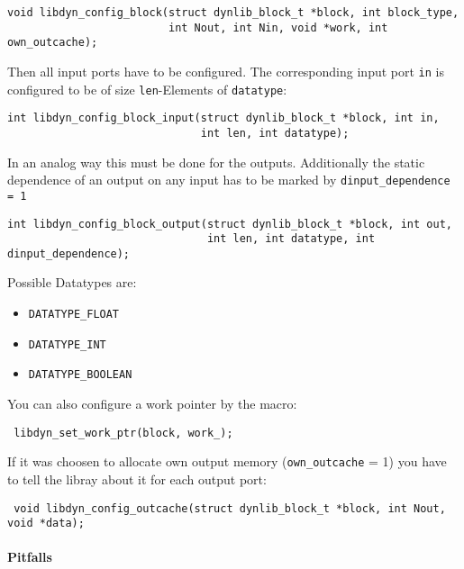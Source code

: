 \documentclass[%
	pdftex,%
	a4paper,%
	oneside,%
	11pt,%
	halfparskip,%
	headsepline,%
	bibtotocnumbered,%
	idxtotoc%
]{scrartcl}
\begin{document}
\begin{verbatim}
void libdyn_config_block(struct dynlib_block_t *block, int block_type, 
                         int Nout, int Nin, void *work, int own_outcache);
\end{verbatim}

Then all input ports have to be configured. The corresponding input port  \texttt{in} is configured to be of size \texttt{len}-Elements of \texttt{datatype}:

\begin{verbatim}
int libdyn_config_block_input(struct dynlib_block_t *block, int in, 
                              int len, int datatype);
\end{verbatim}

In an analog way this must be done for the outputs. Additionally the static dependence of an output on any input has to be marked by \texttt{dinput\_dependence = 1}

\begin{verbatim}
int libdyn_config_block_output(struct dynlib_block_t *block, int out, 
                               int len, int datatype, int dinput_dependence);
\end{verbatim}

Possible Datatypes are:

\begin{itemize}
 \item \texttt{DATATYPE\_FLOAT} 
 \item \texttt{DATATYPE\_INT}
 \item \texttt{DATATYPE\_BOOLEAN}
\end{itemize}

You can also configure a work pointer by the macro:

\begin{verbatim}
 libdyn_set_work_ptr(block, work_);
\end{verbatim}

If it was choosen to allocate own output memory (\texttt{own\_outcache} = 1) you have to tell the libray about it for each output port:

\begin{verbatim}
 void libdyn_config_outcache(struct dynlib_block_t *block, int Nout,  void *data);
\end{verbatim}



\paragraph{Pitfalls}
\end{document}
